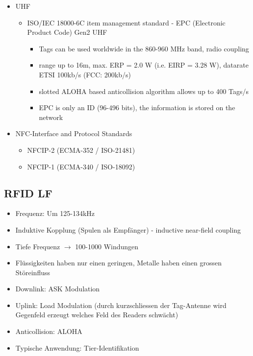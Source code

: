 \begin{itemize}
\begin{itemize}
			\end{itemize}
		\item UHF
			\begin{itemize}
				\item ISO/IEC 18000-6C item management standard - EPC (Electronic Product Code) Gen2 UHF
					\begin{itemize}
						\item Tags can be used worldwide in the 860-960 MHz band, radio coupling
						\item range up to 16m, max. ERP = 2.0 W (i.e. EIRP = 3.28 W), datarate ETSI 100kb/s (FCC: 200kb/s)
						\item slotted ALOHA based anticollision algorithm allows up to 400 Tags/s
						\item EPC is only an ID (96-496 bits), the information is stored on the network
					\end{itemize}
			\end{itemize}
		\item NFC-Interface and Protocol Standards
			\begin{itemize}
				\item NFCIP-2 (ECMA-352 / ISO-21481) 
				\item NFCIP-1 (ECMA-340 / ISO-18092) 
			\end{itemize}
	\end{itemize}	
	
\subsection{RFID LF}
	\begin{itemize}
		\item Frequenz: Um 125-134kHz
		\item Induktive Kopplung (Spulen als Empfänger) - inductive near-field coupling 
		\item Tiefe Frequenz $\rightarrow$ 100-1000 Windungen
		\item Flüssigkeiten haben nur einen geringen, Metalle haben einen grossen Störeinfluss
		\item Downlink: ASK Modulation
		\item Uplink: Load Modulation (durch kurzschliessen der Tag-Antenne wird Gegenfeld erzeugt welches Feld des Readers schwächt)
		\item Anticollision: ALOHA
		\item Typische Anwendung: Tier-Identifikation
	\end{itemize}
	
